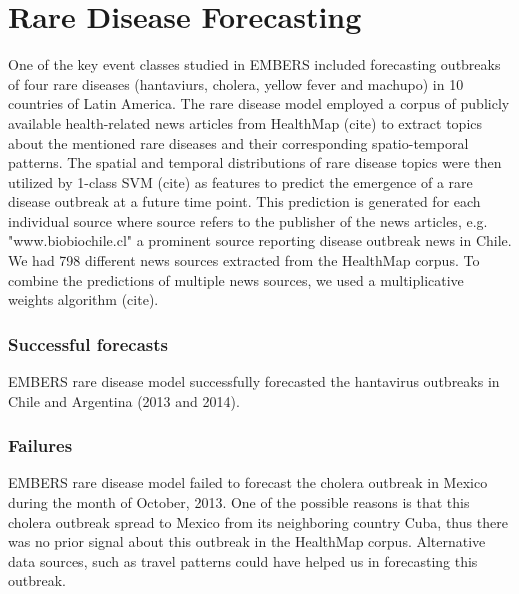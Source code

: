 \section{Rare Disease Forecasting}

One of the key event classes studied in EMBERS included forecasting outbreaks of four rare diseases (hantaviurs, cholera, yellow fever and machupo) in 10 countries of Latin America. The rare disease model employed a corpus of publicly available health-related news articles from HealthMap (cite) to extract topics about the mentioned rare diseases and their corresponding spatio-temporal patterns. The spatial and temporal distributions of rare disease topics were then utilized by 1-class SVM (cite) as features to predict the emergence of a rare disease outbreak at a future time point. This prediction is generated for each individual source where source refers to the publisher of the news articles, e.g. "www.biobiochile.cl" a prominent source reporting disease outbreak news in Chile. We had 798 different news sources extracted from the HealthMap corpus. To combine the predictions of multiple news sources, we used a multiplicative weights algorithm (cite).


\subsubsection{Successful forecasts}

EMBERS rare disease model successfully forecasted the hantavirus outbreaks in Chile and Argentina (2013 and 2014).

\subsubsection{Failures}

EMBERS rare disease model failed to forecast the cholera outbreak in Mexico during the month of October, 2013. One of the possible reasons is that this cholera outbreak spread to Mexico from its neighboring country Cuba, thus there was no prior signal about this outbreak in the HealthMap corpus. Alternative data sources, such as travel patterns could have helped us in forecasting this outbreak.
